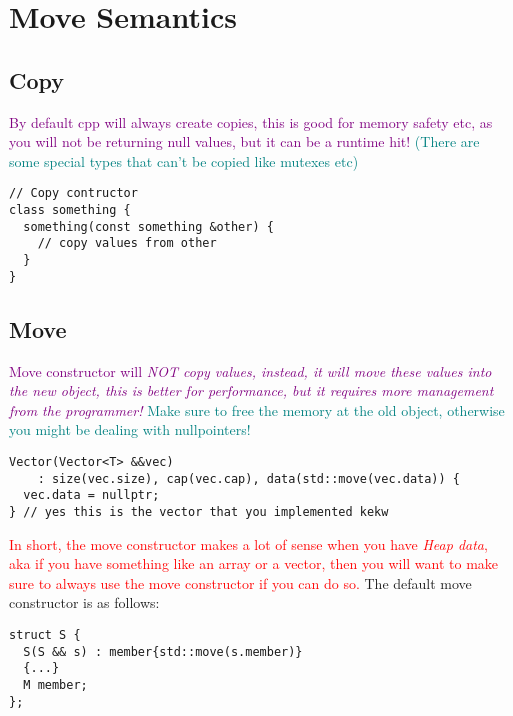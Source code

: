 \documentclass[main.tex,fontsize=8pt,paper=a4,paper=portrait,DIV=calc,]{scrartcl}
\begin{document}
\tableofcontents

\lstset{
    language=c++,
    style=code,
}

\newcommand{\TITLE}{CPP Advanced}
\newcommand{\AUTHOR}{Fabio Lenherr}
\setcounter{tocdepth}{1}

\section{Move Semantics}

\subsection{Copy}
\textcolor{purple}{By default cpp will always create copies, this is good for memory safety etc, as you will not be returning null values, but it can be a runtime hit!}\newline
\textcolor{teal}{(There are some special types that can't be copied like mutexes etc)}
\begin{lstlisting}
// Copy contructor
class something {
  something(const something &other) {
    // copy values from other
  }
}
\end{lstlisting}

\subsection{Move}
\textcolor{purple}{Move constructor will \emph{NOT copy values, instead, it will move these values into the new object, this is better for performance, but it requires more management from the programmer!}}\newline
\textcolor{teal}{Make sure to free the memory at the old object, otherwise you might be dealing with nullpointers!}
\begin{lstlisting}
Vector(Vector<T> &&vec)
    : size(vec.size), cap(vec.cap), data(std::move(vec.data)) {
  vec.data = nullptr;
} // yes this is the vector that you implemented kekw
\end{lstlisting}
\textcolor{red}{In short, the move constructor makes a lot of sense when you have \emph{Heap data}, aka if you have something like an array or a vector, then you will want to make sure to always use the move constructor if you can do so.}\newline
The default move constructor is as follows:
\begin{lstlisting}
struct S {
  S(S && s) : member{std::move(s.member)}
  {...}
  M member;
};
\end{lstlisting}
\end{document}
